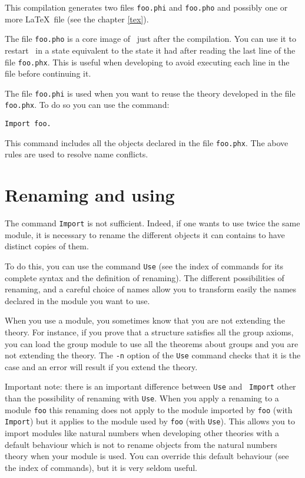 This compilation generates two files {\tt foo.phi} and {\tt foo.pho} and
possibly one or more \LaTeX\ file (see the chapter \ref{tex}).

The file {\tt foo.pho} is a core image of \AFD\ just after the
compilation. You can use it to restart \AFD\ in a state equivalent to the
state it had after reading the last line of the file {\tt foo.phx}. This is
useful when developing to avoid executing each line in the file before
continuing it.

The file {\tt foo.phi} is used when you want to reuse the theory developed in
the file {\tt foo.phx}. To do so you can use the command:
\begin{verbatim}
Import foo.  
\end{verbatim}

This command includes all the objects declared in the file {\tt foo.phx}. The
above rules are used to resolve name conflicts.

\section{Renaming and using}

The command {\tt Import} is not sufficient. Indeed, if one wants to use twice
the same module, it is necessary to rename the different objects it can
contains to have distinct copies of them.  

To do this, you can use the command {\tt Use} (see the index of commands for
its complete syntax and the definition of renaming). The different
possibilities of renaming, and a careful choice of names allow you to
transform easily the names declared in the module you want to use.

When you use a module, you sometimes know that you are not extending the
theory. For instance, if you prove that a structure satisfies all the group
axioms, you can load the group module to use all the theorems about groups and
you are not extending the theory. The {\tt -n} option of the {\tt Use} command
checks that it is the case and an error will result if you extend the theory. 

Important note: there is an important difference between {\tt Use} and {\tt
Import} other than the possibility of renaming with {\tt Use}. When you apply
a renaming to a module {\tt foo} this renaming does not apply to the module
imported by {\tt foo} (with {\tt Import}) but it applies to the module used
by {\tt foo} (with {\tt Use}). This allows you to import modules like natural
numbers when developing other theories with a default behaviour which is not
to rename objects from the natural numbers theory when your module is used.
You can override this default behaviour (see the index of commands), but it is
very seldom useful.

